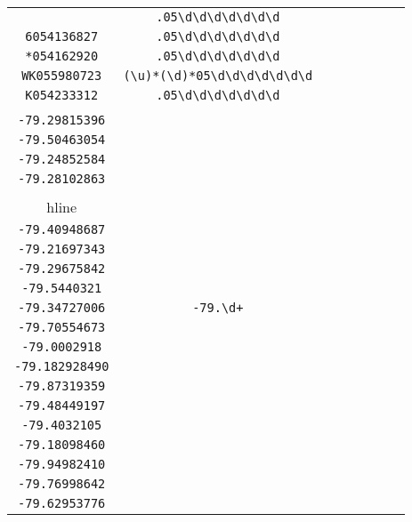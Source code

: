 \begin{longtable}{cccccccc}
\begin{tabular}{ll}
    \verb|`059019221| & \verb|.05\d\d\d\d\d\d\d|\\
\verb|6054136827| & \verb|.05\d\d\d\d\d\d\d|\\
\verb|*054162920| & \verb|.05\d\d\d\d\d\d\d|\\
\verb|WK055980723| & \verb|(\u)*(\d)*05\d\d\d\d\d\d\d|\\
\verb|K054233312| & \verb|.05\d\d\d\d\d\d\d|
\end{tabular}
\\\midrule 
\begin{tabular}{l}
    \verb|-79.5034323|\\
\verb|-79.29815396|\\
\verb|-79.50463054|\\
\verb|-79.24852584|\\
\verb|-79.28102863|\\
\\hline\\
\verb|-79.40948687|\\
\verb|-79.21697343|\\
\verb|-79.29675842|\\
\verb|-79.5440321|\\
\verb|-79.34727006|
\end{tabular}

&
\verb|-79.\d+|
&

\begin{tabular}{l}
    \verb|-79\.\d\d\d(\d)*\d\d\d\d|\\
\verb|-79.70554673|\\
\verb|-79.0002918|\\
\verb|-79.182928490|\\
\verb|-79.87319359|\\
\verb|-79.48449197|
\end{tabular}

&

\begin{tabular}{l}
    \verb@-79\.\d\d\d\d\d\d\d|(\d)@\\
\verb|-79.4032105|\\
\verb|-79.18098460|\\
\verb|-79.94982410|\\
\verb|-79.76998642|\\
\verb|-79.62953776|
\end{tabular}

&


\end{longtable}
